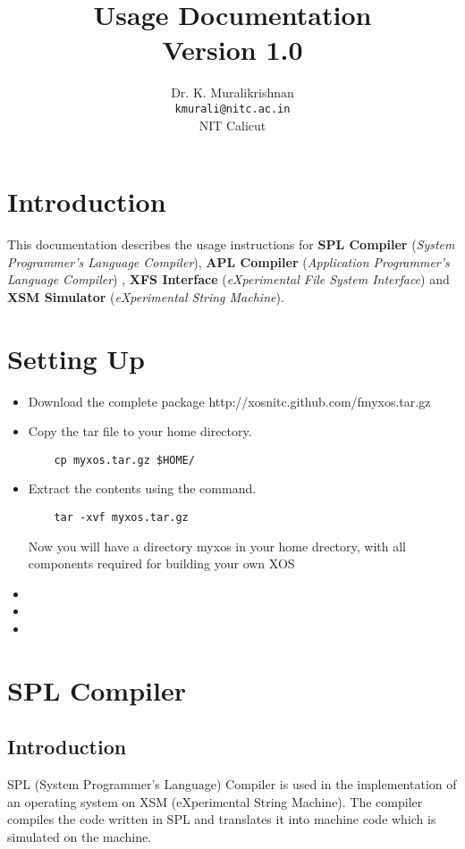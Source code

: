 \documentclass[11pt]{report}
\title{Usage Documentation \\
Version 1.0}
\author{Dr. K. Muralikrishnan  \\ \texttt{kmurali@nitc.ac.in} \\ {NIT Calicut} }
\begin{document}
\maketitle
\pagebreak

\thispagestyle{plain}

\tableofcontents
\pagebreak




\chapter{Introduction}
This documentation describes the usage instructions for \textbf{SPL Compiler} (\textit{System Programmer’s Language Compiler}), \textbf{APL Compiler} (\textit{Application Programmer’s Language Compiler}) , \textbf{XFS Interface} (\textit{eXperimental File System Interface}) and \textbf{XSM Simulator} (\textit{eXperimental String Machine}).



\chapter{Setting Up}
\begin{itemize}
\item Download the complete package http://xosnitc.github.com/fmyxos.tar.gz
\item Copy the tar file to your home directory.
	\begin{verbatim}
	cp myxos.tar.gz $HOME/
	\end{verbatim}
\item Extract the contents using the command.
	\begin{verbatim}
	tar -xvf myxos.tar.gz
	\end{verbatim}
	Now you will have a directory myxos in your home drectory, with all components required for building your own XOS
\item 
\item
\item
\end{itemize}


\chapter{SPL Compiler}

\section{Introduction}
SPL (System Programmer's Language) Compiler is used in the implementation of an operating system on XSM (eXperimental String Machine). The compiler compiles the code written in SPL and translates it into machine code which is simulated on the machine.
\end{document}
